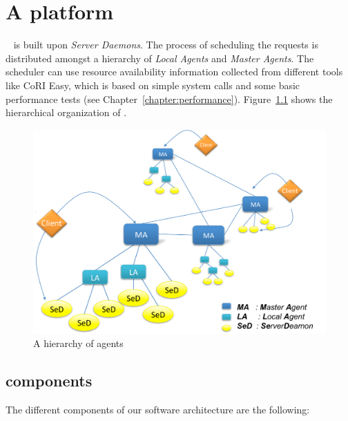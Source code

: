
\chapter{A \diet platform}\label{ch:description}

\diet~\cite{Caron:2006gf} is built upon \emph{Server Daemons}. The process of
scheduling the requests is distributed amongst a hierarchy of \emph{Local
Agents} and \emph{Master Agents}. The scheduler can use resource availability
information collected from different tools like CoRI Easy, which is based on 
simple system calls and some basic performance tests (see
Chapter~\ref{chapter:performance}). Figure~\ref{fig:platform} shows the
hierarchical organization of \diet.

\begin{figure}[htb]
 \begin{center}
  \includegraphics[scale=.7]{fig/global_platform}
  \caption{\label{fig:platform} A hierarchy of \diet agents}
 \end{center}
\end{figure}

\section{\diet components}
\label{sec:components}

The different components of our software architecture are the
following:

